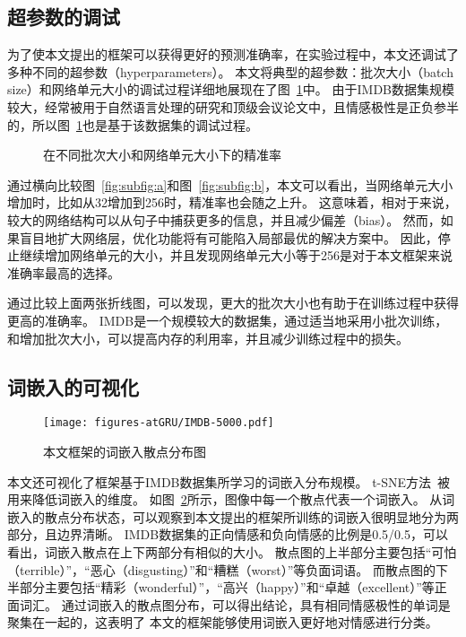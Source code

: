 \subsection{超参数的调试}
为了使本文提出的框架可以获得更好的预测准确率，在实验过程中，本文还调试了多种不同的超参数（hyperparameters）。
本文将典型的超参数：批次大小（batch size）和网络单元大小的调试过程详细地展现在了图~\ref{fig:fig3}中。
由于IMDB数据集规模较大，经常被用于自然语言处理的研究和顶级会议论文中，且情感极性是正负参半的，所以图~\ref{fig:fig3}也是基于该数据集的调试过程。

\begin{figure}[h!]
    \centering
    \caption{在不同批次大小和网络单元大小下的精准率}
    \label{fig:fig3}
\end{figure}

通过横向比较图~\ref{fig:subfig:a}和图~\ref{fig:subfig:b}，本文可以看出，当网络单元大小增加时，比如从32增加到256时，精准率也会随之上升。
这意味着，相对于来说，较大的网络结构可以从句子中捕获更多的信息，并且减少偏差（bias）。
然而，如果盲目地扩大网络层，优化功能将有可能陷入局部最优的解决方案中。
因此，停止继续增加网络单元的大小，并且发现网络单元大小等于256是对于本文框架来说准确率最高的选择。

通过比较上面两张折线图，可以发现，更大的批次大小也有助于在训练过程中获得更高的准确率。
IMDB是一个规模较大的数据集，通过适当地采用小批次训练，和增加批次大小，可以提高内存的利用率，并且减少训练过程中的损失。

\subsection{词嵌入的可视化}
\begin{figure}[h!]
    \centering
    \texttt{[image: figures-atGRU/IMDB-5000.pdf]}
    \caption{本文框架的词嵌入散点分布图}
    \label{fig:fig4}
\end{figure}

本文还可视化了框架基于IMDB数据集所学习的词嵌入分布规模。
t-SNE方法~被用来降低词嵌入的维度。
如图~\ref{fig:fig4}所示，图像中每一个散点代表一个词嵌入。
从词嵌入的散点分布状态，可以观察到本文提出的框架所训练的词嵌入很明显地分为两部分，且边界清晰。
IMDB数据集的正向情感和负向情感的比例是0.5/0.5，可以看出，词嵌入散点在上下两部分有相似的大小。
散点图的上半部分主要包括“可怕（terrible）”，“恶心（disgusting）”和“糟糕（worst）”等负面词语。
而散点图的下半部分主要包括“精彩（wonderful）”，“高兴（happy）”和“卓越（excellent）”等正面词汇。
通过词嵌入的散点图分布，可以得出结论，具有相同情感极性的单词是聚集在一起的，这表明了
本文的框架能够使用词嵌入更好地对情感进行分类。

